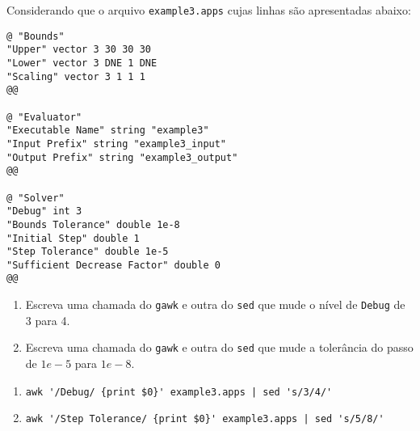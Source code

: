 \begin{Exercise}[label={0004}, difficulty={1}, origin={gawk}]
  Considerando que o arquivo \lstinline+example3.apps+ cujas linhas são
  apresentadas abaixo:
  \begin{lstlisting}
@ "Bounds"
"Upper" vector 3 30 30 30 
"Lower" vector 3 DNE 1 DNE
"Scaling" vector 3 1 1 1 
@@

@ "Evaluator"
"Executable Name" string "example3"
"Input Prefix" string "example3_input"
"Output Prefix" string "example3_output"
@@

@ "Solver" 
"Debug" int 3
"Bounds Tolerance" double 1e-8
"Initial Step" double 1
"Step Tolerance" double 1e-5
"Sufficient Decrease Factor" double 0
@@
  \end{lstlisting}
  \begin{enumerate}
    \item Escreva uma chamada do \lstinline+gawk+ e outra do \lstinline+sed+ que
      mude o nível de \lstinline+Debug+ de 3 para 4.
    \item Escreva uma chamada do \lstinline+gawk+ e outra do \lstinline+sed+ que
      mude a tolerância do passo de $1e-5$ para $1e-8$.
  \end{enumerate}
\end{Exercise}
\begin{Answer}[ref={0004}]
  \begin{enumerate}
    \item \lstinline+awk '/Debug/ {print $0}' example3.apps | sed 's/3/4/'+
    \item \lstinline+awk '/Step Tolerance/ {print $0}' example3.apps | sed 's/5/8/'+
  \end{enumerate}
\end{Answer}
